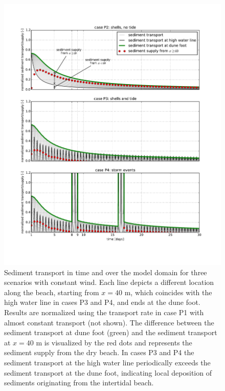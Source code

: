 \begin{figure}
  \centering
  \includegraphics[width=\columnwidth]{../Figures/transport_rate_v2}
  \caption{Sediment transport in time and over the model domain for
    three scenarios with constant wind. Each line depicts a different
    location along the beach, starting from $x = 40$ m, which
    coincides with the high water line in cases P3 and P4, and ends at
    the dune foot. Results are normalized using the transport rate in
    case P1 with almost constant transport (not shown). The difference
    between the sediment transport at dune foot (green) and the
    sediment transport at $x = 40$ m is visualized by the red dots and
    represents the sediment supply from the dry beach. In cases P3 and
    P4 the sediment transport at the high water line periodically
    exceeds the sediment transport at the dune foot, indicating local
    deposition of sediments originating from the intertidal beach.}
  \label{fig:transport_rate}
\end{figure}

